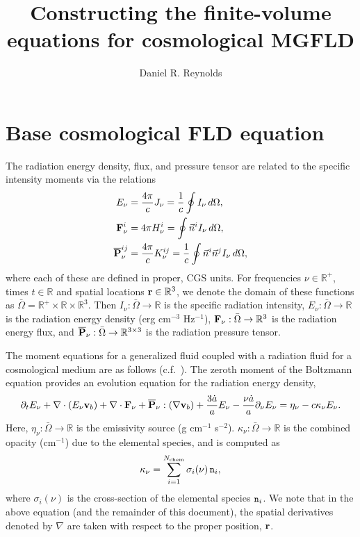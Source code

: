 \documentclass[10pt]{article}
\author{Daniel R. Reynolds}
\title{Constructing the finite-volume equations for cosmological MGFLD}
\renewcommand{\(}{\left(}
\renewcommand{\)}{\right)}
\newcommand{\vb}{{\bf v}_b}
\newcommand{\rvec}{{\bf r}}
\newcommand{\Omegabar}{\bar{\Omega}}
\newcommand{\adot}{\dot{a}}
\newcommand{\Enu}{E_{\nu}}
\newcommand{\Fnu}{{\bf F}_{\nu}}
\newcommand{\Pnu}{\overline{\bf P}_{\nu}}
\newcommand{\R}{\mathbb{R}}
\newcommand{\Rthree}{\R^3}
\newcommand{\mn}{{\tt n}}
\begin{document}
\maketitle


\section{Base cosmological FLD equation}
\label{sec:PDE}

The radiation energy density, flux, and pressure tensor are related
to the specific intensity moments via the relations
\begin{align}
  \label{eq:density_wrt_intensity}
  \Enu &= \frac{4\pi}{c} J_{\nu} = \frac1c \oint I_{\nu} \,d\Omega, \\
  \label{eq:flux_wrt_intensity}
  \Fnu^i &= 4 \pi H^i_{\nu} = \oint \vec{n}^i I_{\nu} \,d\Omega, \\
  \label{eq:pressure_wrt_intensity}
  \Pnu^{ij} &= \frac{4\pi}{c} K^{ij}_\nu = \frac1c \oint \vec{n}^i
    \vec{n}^j I_{\nu} \,d\Omega,
\end{align}
where each of these are defined in proper, CGS units.  
For frequencies $\nu\in\R^+$, times $t\in\R$ and spatial locations
$\rvec\in\R^3$, we denote the domain of these functions as $\Omegabar
= \R^+\times\R\times\R^3$. Then $I_{\nu}:\Omegabar\rightarrow\R$ is
the specific radiation intensity, $\Enu:\Omegabar\rightarrow\R$ is the
radiation energy density (erg cm$^{-3}$ Hz$^{-1}$),
$\Fnu:\Omegabar\rightarrow\Rthree$ is the radiation energy flux, and
$\Pnu:\Omegabar\rightarrow\R^{3\times 3}$ is the radiation pressure
tensor.

The moment equations for a generalized fluid coupled with a radiation
fluid for a cosmological medium are as follows
(c.f.~\cite{HayesNorman2003,Paschos2005}).  The zeroth moment of the 
Boltzmann equation provides an evolution equation for the radiation
energy density,
\begin{equation}
\label{eq:zero_mom}
  \partial_{t} E_{\nu} + \nabla\cdot(\Enu\vb) 
    + \nabla\cdot\Fnu + \Pnu:(\nabla\vb) + \frac{3\adot}{a}\Enu -
    \frac{\nu\adot}{a}\partial_{\nu} \Enu
  = \eta_{\nu} -c \kappa_{\nu} \Enu.
\end{equation}
Here, $\eta_{\nu}:\Omegabar\rightarrow\R$ is the emissivity source
(g cm$^{-1}$ s$^{-2}$).  $\kappa_{\nu}:\Omegabar\rightarrow\R$ is the
combined opacity (cm$^{-1}$) due to the elemental species, and is
computed as 
\begin{equation}
\label{eq:opacity_def}
  \kappa_{\nu} = \sum_{i=1}^{N_\text{chem}} \sigma_{i}(\nu)\,\mn_i,
\end{equation}
where $\sigma_i(\nu)$ is the cross-section of the elemental species
$\mn_i$.  We note that in the above equation (and the remainder of
this document), the spatial derivatives denoted by $\nabla$ are taken
with respect to the proper position, $\rvec$.
\end{document}

